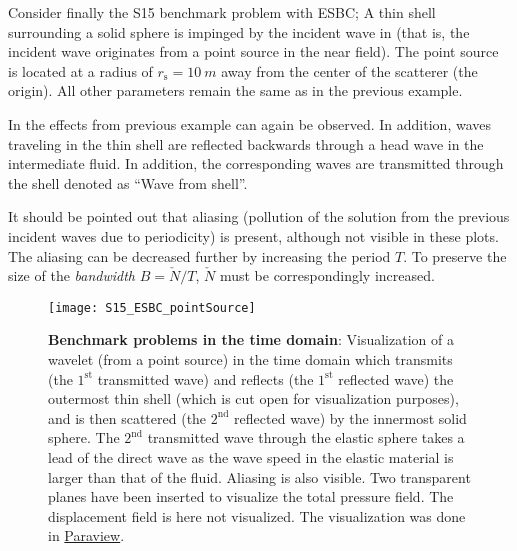Consider finally the S15 benchmark problem with ESBC; A thin shell surrounding a solid sphere is impinged by the incident wave in  (that is, the incident wave originates from a point source in the near field). The point source is located at a radius of $r_{\mathrm{s}}=\SI{10}{m}$ away from the center of the scatterer (the origin). All other parameters remain the same as in the previous example. 

In  the effects from previous example can again be observed. In addition, waves traveling in the thin shell are reflected backwards through a head wave in the intermediate fluid. In addition, the corresponding waves are transmitted through the shell denoted as ``Wave from shell''.

It should be pointed out that aliasing (pollution of the solution from the previous incident waves due to periodicity) is present, although not visible in these plots. The aliasing can be decreased further by increasing the period $T$. To preserve the size of the \textit{bandwidth} $B=\check{N}/T$, $\check{N}$ must be correspondingly increased. 
\begin{figure}
	\centering
	\texttt{[image: S15\_ESBC\_pointSource]}
    \caption{\textbf{Benchmark problems in the time domain}: Visualization of a wavelet (from a point source) in the time domain which transmits (the $1^{\mathrm{st}}$ transmitted wave) and reflects (the $1^{\mathrm{st}}$ reflected wave) the outermost thin shell (which is cut open for visualization purposes), and is then scattered (the $2^{\mathrm{nd}}$ reflected wave) by the innermost solid sphere. The $2^{\mathrm{nd}}$ transmitted wave through the elastic sphere takes a lead of the direct wave as the wave speed in the elastic material is larger than that of the fluid. Aliasing is also visible. Two transparent planes have been inserted to visualize the total pressure field. The displacement field is here not visualized. The visualization was done in \href{http://www.paraview.org/}{Paraview}.}
	\label{Fig1:S15_ESBC_pointCharge}
\end{figure}

